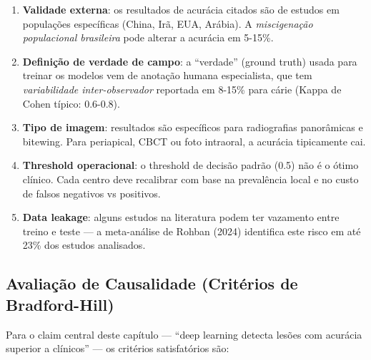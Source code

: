 \begin{enumerate}
    \item \textbf{Validade externa}: os resultados de acurácia
    citados são de estudos em populações específicas
    (China, Irã, EUA, Arábia). A \emph{miscigenação populacional brasileira}
    pode alterar a acurácia em 5-15\%.
    \item \textbf{Definição de verdade de campo}: a ``verdade''
    (ground truth) usada para treinar os modelos vem de anotação humana
    especialista, que tem \emph{variabilidade inter-observador}
    reportada em 8-15\% para cárie (Kappa de Cohen típico: 0.6-0.8).
    \item \textbf{Tipo de imagem}: resultados são específicos para
    radiografias panorâmicas e bitewing. Para periapical, CBCT ou
    foto intraoral, a acurácia tipicamente cai.
    \item \textbf{Threshold operacional}: o threshold de decisão
    padrão (0.5) não é o ótimo clínico. Cada centro deve recalibrar
    com base na prevalência local e no custo de falsos negativos vs
    positivos.
    \item \textbf{Data leakage}: alguns estudos na literatura
    podem ter vazamento entre treino e teste --- a meta-análise
    de Rohban (2024) \cite{rohban2024} identifica este risco em
    até 23\% dos estudos analisados.
\end{enumerate}

\subsection*{Avaliação de Causalidade (Critérios de Bradford-Hill)}


Para o claim central deste capítulo --- ``deep learning detecta
lesões com acurácia superior a clínicos'' --- os critérios
satisfatórios são:

